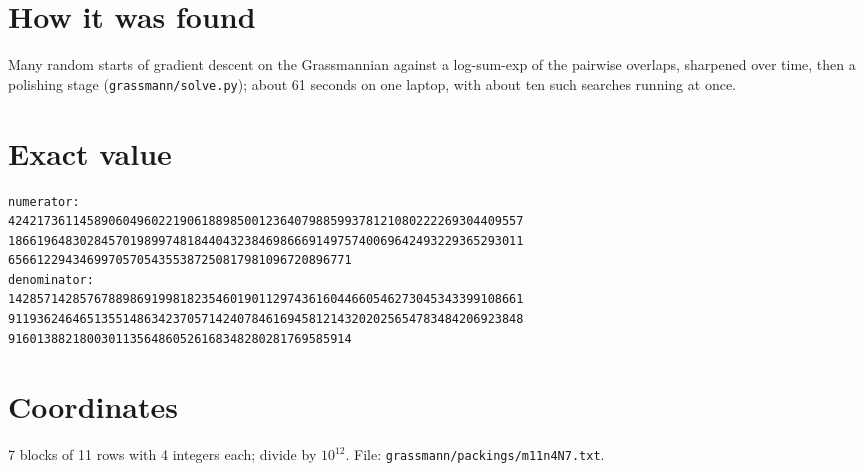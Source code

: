 \documentclass[11pt,a4paper]{article}
\begin{document}
\section{How it was found}
Many random starts of gradient descent on the Grassmannian against a log-sum-exp of the pairwise overlaps, sharpened over time, then a polishing stage (\texttt{grassmann/solve.py}); about 61 seconds on one laptop, with about ten such searches running at once.


\appendix
\section{Exact value}
{\small
\begin{verbatim}
numerator:
424217361145890604960221906188985001236407988599378121080222269304409557
186619648302845701989974818440432384698666914975740069642493229365293011
656612294346997057054355387250817981096720896771
denominator:
142857142857678898691998182354601901129743616044660546273045343399108661
911936246465135514863423705714240784616945812143202025654783484206923848
916013882180030113564860526168348280281769585914
\end{verbatim}}

\section{Coordinates}
7 blocks of 11 rows with 4 integers each; divide by $10^{12}$. File: \texttt{grassmann/packings/m11n4N7.txt}.
{\tiny
\begin{multicols}{3}
\end{multicols}}
\end{document}
